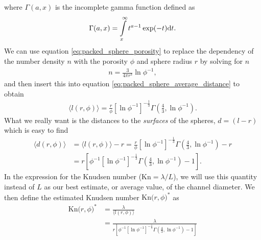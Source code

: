 where $\Gamma(a,x)$ is the incomplete gamma function defined as
\begin{align}
	\Gamma(a,x) = \int\limits_x^\infty t^{a-1}\exp(-t)\mathrm{d}t.
\end{align}
We can use equation \eqref{eq:packed_sphere_porosity} to replace the dependency of the number density $n$ with the porosity $\phi$ and sphere radius $r$ by solving for $n$ 
\begin{align}
	n = \frac{3}{4\pi r^3} \ln\phi^{-1},
\end{align}
and then insert this into equation \eqref{eq:packed_sphere_average_distance} to obtain
\begin{align}
	\langle l(r,\phi) \rangle = \frac{r}{\phi}\left[\ln\phi^{-1}\right]^{-\frac{1}{3}}\Gamma\left(\frac{4}{3},\ln\phi^{-1}\right).
\end{align}
What we really want is the distances to the \textit{surfaces} of the spheres, $d=(l-r)$ which is easy to find
\begin{align}
	\langle d(r,\phi)\rangle &= \langle l(r,\phi)\rangle - r = \frac{r}{\phi}\left[\ln\phi^{-1}\right]^{-\frac{1}{3}}\Gamma\left(\frac{4}{3},\ln\phi^{-1}\right) - r\\
	&= r\left[\phi^{-1}\left[\ln\phi^{-1}\right]^{-\frac{1}{3}}\Gamma\left(\frac{4}{3},\ln\phi^{-1}\right) - 1\right].
\end{align}
In the expression for the Knudsen number ($\text{Kn}=\lambda/L$), we will use this quantity instead of $L$ as our best estimate, or average value, of the channel diameter. We then define the estimated Knudsen number $\text{Kn($r,\phi$)}^*$ as
\begin{align}
	\text{Kn($r,\phi$)}^* &= \frac{\lambda}{\langle l(r,\phi)\rangle}\\
	\label{eq:packed_sphere_estimated_knudsen}
	&= \frac{\lambda}{r\left[\phi^{-1}\left[\ln\phi^{-1}\right]^{-\frac{1}{3}}\Gamma\left(\frac{4}{3},\ln\phi^{-1}\right) - 1\right]}
\end{align}